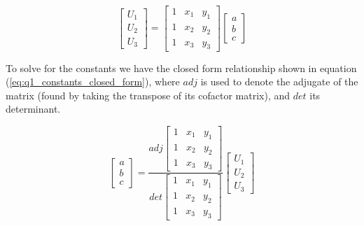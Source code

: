 \documentclass[11pt]{amsart}
\begin{document}
\begin{equation}
	\label{eq:q1_constants}
        \begin{bmatrix}
            U_1\\
            U_2\\
            U_3
        \end{bmatrix}
        =
        \begin{bmatrix}
            1 & x_1 & y_1\\ 
            1 & x_2 & y_2\\ 
            1 & x_3 & y_3 
        \end{bmatrix} 
        \begin{bmatrix}
            a\\
            b\\
            c
        \end{bmatrix}
\end{equation}

To solve for the constants we have the closed form relationship shown in equation (\ref{eq:q1_constants_closed_form}), where $adj$ is used to denote the adjugate of the matrix (found by taking the transpose of its cofactor matrix), and $det$ its determinant.

\begin{equation}
	\label{eq:q1_constants_closed_form}
        \begin{bmatrix}
            a\\
            b\\
            c
        \end{bmatrix}
        =
        \frac{
        	   adj
            \begin{bmatrix}
                1 & x_1 & y_1\\ 
                1 & x_2 & y_2\\ 
                1 & x_3 & y_3 
            \end{bmatrix}
            }{
            det
            \begin{bmatrix}
                1 & x_1 & y_1\\ 
                1 & x_2 & y_2\\ 
                1 & x_3 & y_3 
            \end{bmatrix}
        }
         \begin{bmatrix}
            U_1\\
            U_2\\
            U_3
        \end{bmatrix}
\end{equation}
\end{document}
